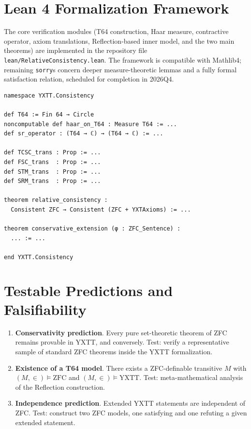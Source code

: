 \documentclass[12pt,a4paper]{article}
\theoremstyle{plain}
\theoremstyle{definition}
\newcommand{\YXTT}{\mathrm{YXTT}}
\newcommand{\ZFC}{\mathrm{ZFC}}
\begin{document}
\section{Lean 4 Formalization Framework}
\label{sec:lean_verification}

The core verification modules (T64 construction, Haar measure, contractive operator, axiom translations, Reflection-based inner model, and the two main theorems) are implemented in the repository file
\texttt{lean/RelativeConsistency.lean}. The framework is compatible with Mathlib4; remaining \texttt{sorry}s concern deeper measure-theoretic lemmas and a fully formal satisfaction relation, scheduled for completion in 2026Q4.

\begin{lstlisting}[style=lean, caption={Core Lean 4 modules (abridged)}]
namespace YXTT.Consistency

def T64 := Fin 64 → Circle
noncomputable def haar_on_T64 : Measure T64 := ...
def sr_operator : (T64 → ℂ) → (T64 → ℂ) := ...

def TCSC_trans : Prop := ...
def FSC_trans  : Prop := ...
def STM_trans  : Prop := ...
def SRM_trans  : Prop := ...

theorem relative_consistency :
  Consistent ZFC → Consistent (ZFC + YXTAxioms) := ...

theorem conservative_extension (φ : ZFC_Sentence) :
  ... := ...

end YXTT.Consistency
\end{lstlisting}

\section{Testable Predictions and Falsifiability}
\label{sec:predictions}

\begin{enumerate}
  \item \textbf{Conservativity prediction}. Every pure set-theoretic theorem of ZFC remains provable in YXTT, and conversely. Test: verify a representative sample of standard ZFC theorems inside the YXTT formalization.
  \item \textbf{Existence of a T64 model}. There exists a ZFC-definable transitive $M$ with $(M,\in)\vDash\ZFC$ and $(M,\in)\vDash\YXTT$. Test: meta-mathematical analysis of the Reflection construction.
  \item \textbf{Independence prediction}. Extended YXTT statements are independent of ZFC. Test: construct two ZFC models, one satisfying and one refuting a given extended statement.
\end{enumerate}
\end{document}

